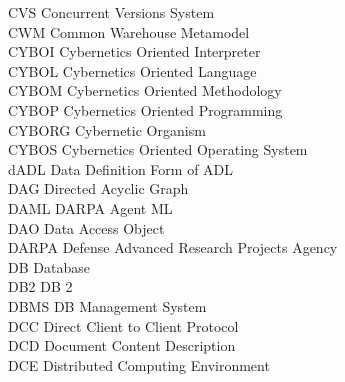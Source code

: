 \begin{tabbing}
    \>CVS \>\>Concurrent Versions System\\


    \>CWM \>\>Common Warehouse Metamodel\\

    \>CYBOI \>\>Cybernetics Oriented Interpreter\\

    \>CYBOL \>\>Cybernetics Oriented Language\\

    \>CYBOM \>\>Cybernetics Oriented Methodology\\

    \>CYBOP \>\>Cybernetics Oriented Programming\\

    \>CYBORG \>\>Cybernetic Organism\\

    \>CYBOS \>\>Cybernetics Oriented Operating System\\


    \>dADL \>\>Data Definition Form of ADL\\

    \>DAG \>\>Directed Acyclic Graph\\

    \>DAML \>\>DARPA Agent ML\\

    \>DAO \>\>Data Access Object\\

    \>DARPA \>\>Defense Advanced Research Projects Agency\\

    \>DB \>\>Database\\

    \>DB2 \>\>DB 2\\

    \>DBMS \>\>DB Management System\\

    \>DCC \>\>Direct Client to Client Protocol\\

    \>DCD \>\>Document Content Description\\

    \>DCE \>\>Distributed Computing Environment\\


\end{tabbing}
